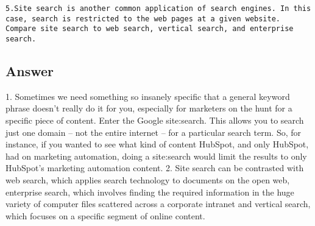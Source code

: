 \documentclass[letterpaper,11pt]{article}
\begin{document}
\begin{verbatim}
5.Site search is another common application of search engines. In this case, search is restricted to the web pages at a given website. Compare site search to web search, vertical search, and enterprise search. 
\end{verbatim}

\subsection*{Answer}

1. Sometimes we need something so insanely specific that a general keyword phrase doesn't really do it for you, especially for marketers on the hunt for a specific piece of content. Enter the Google site:search. This allows you to search just one domain -- not the entire internet -- for a particular search term. So, for instance, if you wanted to see what kind of content HubSpot, and only HubSpot, had on marketing automation, doing a site:search would limit the results to only HubSpot's marketing automation content.
2. Site search can be contrasted with web search, which applies search technology to documents on the open web, enterprise search, which involves finding the required information in the huge variety of computer files scattered across a corporate intranet and vertical search, which focuses on a specific segment of online content.
\end{document}
